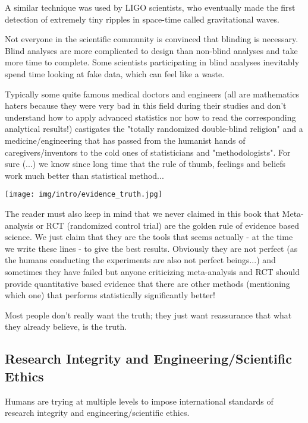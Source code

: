 	A similar technique was used by LIGO scientists, who eventually made the first detection of extremely tiny ripples in space-time called gravitational waves.

	Not everyone in the scientific community is convinced that blinding is necessary. Blind analyses are more complicated to design than non-blind analyses and take more time to complete. Some scientists participating in blind analyses inevitably spend time looking at fake data, which can feel like a waste.
	
	Typically some quite famous medical doctors and engineers (all are mathematics haters because they were very bad in this field during their studies and don't understand how to apply advanced statistics nor how to read the corresponding analytical results!) castigates the "totally randomized double-blind religion" and a medicine/engineering that has passed from the humanist hands of caregivers/inventors to the cold ones of statisticians and "methodologists". For sure (...) we know since long time that the rule of thumb, feelings and beliefs work much better than statistical method...
	\begin{center}
		\texttt{[image: img/intro/evidence\_truth.jpg]}
	\end{center}
	The reader must also keep in mind that we never claimed in this book that Meta-analysis or RCT (randomized control trial) are the golden rule of evidence based science. We just claim that they are the tools that seems actually - at the time we write these lines - to give the best results. Obviously they are not perfect (as the humans conducting the experiments are also not perfect beings...) and sometimes they have failed but anyone criticizing meta-analysis and RCT should provide quantitative based evidence that there are other methods (mentioning which one) that performs statistically significantly better!
	
	\begin{fquote}Most people don't really want the truth; they just want reassurance that what they already believe, is the truth.
 	\end{fquote}
	
	\pagebreak
	\subsection{Research Integrity and Engineering/Scientific Ethics}
	Humans are trying at multiple levels to impose international standards of research integrity and engineering/scientific ethics.
	
